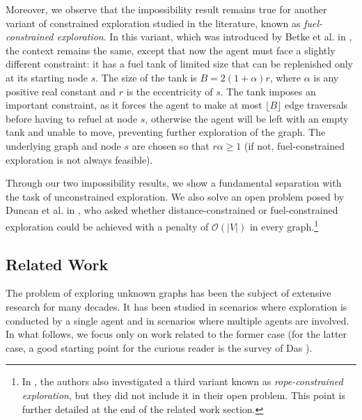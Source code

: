 \documentclass[11pt]{article}
\begin{document}
Moreover, we observe that the impossibility result remains true for another variant of constrained exploration studied in the literature, known as \emph{fuel-constrained exploration}. In this variant, which was introduced by Betke et al. in \cite{BetkeRS95}, the context remains the same, except that now the agent must face a slightly different constraint: it has a fuel tank of limited size that can be replenished only at its starting node $s$. The size of the tank is $B=2(1+\alpha)r$, where $\alpha$ is any positive real constant and $r$ is the eccentricity of $s$. The tank imposes an important constraint, as it forces the agent to make at most {$\lfloor B\rfloor$} edge traversals before having to refuel at node $s$, otherwise the agent will be left with an empty tank and unable to move, preventing further exploration of the graph. The underlying graph and node $s$ are chosen so that $r\alpha\geq 1$ (if not, fuel-constrained exploration is not always feasible).

Through our two impossibility results, we show a fundamental
separation with the task of unconstrained exploration. We also solve
an open problem posed by Duncan et al. in \cite{DuncanKK06}, who asked
whether distance-constrained or fuel-constrained exploration could be
achieved with a penalty of $\mathcal{O}(|V|)$ in every
graph.\footnote{In \cite{DuncanKK06}, the authors also investigated a
third variant known as \emph{rope-constrained exploration}, but they
did not include it in their open problem. This point is further
detailed at the end of the related work section.}



\subsection{Related Work}

The problem of exploring unknown graphs has been the subject of
extensive research for many decades. It has been studied in scenarios
where exploration is conducted by a single agent and in scenarios
where multiple agents are involved. In what follows, we focus only on
work related to the former case (for the latter case, a good starting
point for the curious reader is the survey of Das \cite{Das19}).
\end{document}
